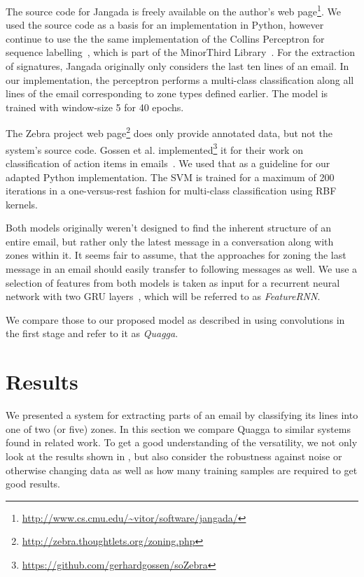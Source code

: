 \documentclass{llncs}
\begin{document}
The source code for Jangada is freely available on the author's web page\footnote{\url{http://www.cs.cmu.edu/~vitor/software/jangada/}}.
We used the source code as a basis for an implementation in Python, however continue to use the the same implementation of the Collins Perceptron for sequence labelling~\cite{cperceptron}, which is part of the MinorThird Library~\cite{minorthird}.
For the extraction of signatures, Jangada originally only considers the last ten lines of an email.
In our implementation, the perceptron performs a multi-class classification along all lines of the email corresponding to zone types defined earlier.
The model is trained with window-size 5 for 40 epochs.

The Zebra project web page\footnote{\url{http://zebra.thoughtlets.org/zoning.php}} does only provide annotated data, but not the system's source code. 
Gossen et al. implemented\footnote{\url{https://github.com/gerhardgossen/soZebra}} it for their work on classification of action items in emails~\cite{sozebra}.
We used that as a guideline for our adapted Python implementation.
The SVM is trained for a maximum of 200 iterations in a one-versus-rest fashion for multi-class classification using RBF kernels.

Both models originally weren't designed to find the inherent structure of an entire email, but rather only the latest message in a conversation along with zones within it.
It seems fair to assume, that the approaches for zoning the last message in an email should easily transfer to following messages as well.
We use a selection of features from both models is taken as input for a recurrent neural network with two GRU layers~\cite{gru}, which will be referred to as \textit{FeatureRNN}.

We compare those to our proposed model as described in  using convolutions in the first stage and refer to it as \textit{Quagga}.



\section{Results}
We presented a system for extracting parts of an email by classifying its lines into one of two (or five) zones.
In this section we compare Quagga to similar systems found in related work.
To get a good understanding of the versatility, we not only look at the results shown in , but also consider the robustness against noise or otherwise changing data as well as how many training samples are required to get good results.
\end{document}
